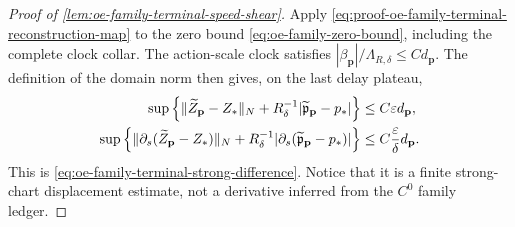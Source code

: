 \begin{proof}[Proof of
\cref{lem:oe-family-terminal-speed-shear}]
Apply
\cref{eq:proof-oe-family-terminal-reconstruction-map} to the zero bound
\cref{eq:oe-family-zero-bound}, including the complete clock collar.
The action-scale clock satisfies
\(|\beta_{\mathbf p}|/\Lambda_{R,\delta}\le Cd_{\mathbf p}\).
The definition of the domain norm then gives, on the last delay plateau,
\begin{align}
 \sup\left\{\|\widetilde Z_{\mathbf p}-Z_*\|_N
       +R_\delta^{-1}
          |\widetilde{\mathfrak p}_{\mathbf p}-p_*|\right\}
 &\le C\varepsilon d_{\mathbf p},\notag\\
 \sup\left\{\|\partial_s(
          \widetilde Z_{\mathbf p}-Z_*)\|_N
       +R_\delta^{-1}
          |\partial_s(
          \widetilde{\mathfrak p}_{\mathbf p}-p_*)|\right\}
 &\le C\frac{\varepsilon}{\delta}d_{\mathbf p}.
                                                        \label{eq:proof-oe-family-terminal-strong-difference}
\end{align}
This is \cref{eq:oe-family-terminal-strong-difference}.  Notice that it
is a finite strong-chart displacement estimate, not a derivative inferred
from the \(C^0\) family ledger.


\end{proof}
